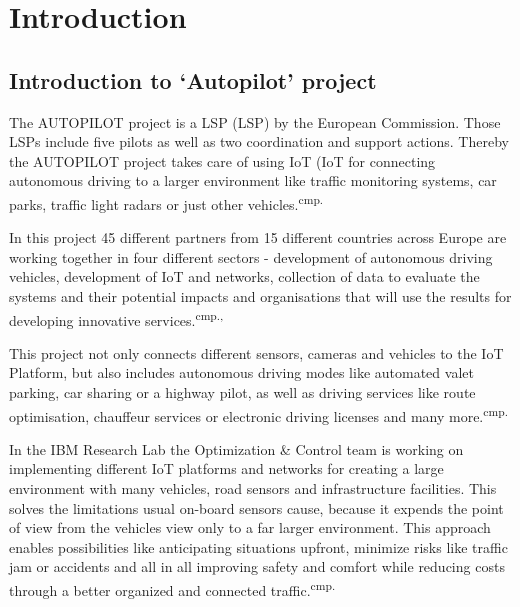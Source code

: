 
\chapter{Introduction}

\section{Introduction to `Autopilot' project}

The AUTOPILOT project is a \acs{LSP} (\acl{LSP}) by the European Commission. Those LSPs include five pilots as well as two coordination and support actions. Thereby the AUTOPILOT project takes care of using \acs{IoT} (\acl{IoT} for connecting autonomous driving to a larger environment like traffic monitoring systems, car parks, traffic light radars or just other vehicles.\textsuperscript{cmp.\cite{2}}


In this project 45 different partners from 15 different countries across Europe are working together in four different sectors - development of autonomous driving vehicles, development of IoT and networks, collection of data to evaluate the systems and their potential impacts and organisations that will use the results for developing innovative services.\textsuperscript{cmp.\cite{3},\cite{4}}


This project not only connects different sensors, cameras and vehicles to the IoT Platform, but also includes autonomous driving modes like automated valet parking, car sharing or a highway pilot, as well as driving services like route optimisation, chauffeur services or electronic driving licenses and many more.\textsuperscript{cmp.\cite{5}}


In the IBM Research Lab the Optimization \& Control team is working on implementing different IoT platforms and networks for creating a large environment with many vehicles, road sensors and infrastructure facilities. This solves the limitations usual on-board sensors cause, because it expends the point of view from the vehicles view only to a far larger environment. This approach enables possibilities like anticipating situations upfront, minimize risks like traffic jam or accidents and all in all improving safety and comfort while reducing costs through a better organized and connected traffic.\textsuperscript{cmp.\cite{6}}

